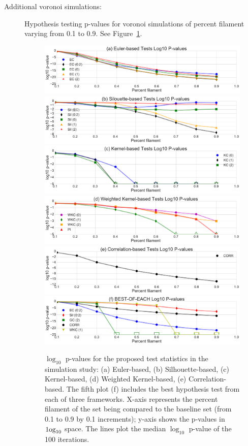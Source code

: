 \documentclass[12pt]{article}
\newcommand{\figref}[1]{Figure~\ref{#1}}
\begin{document}
\begin{description}

\item[Additional voronoi simulations:] Hypothesis testing p-values for voronoi simulations of percent filament varying from 0.1 to 0.9. See \figref{fig:linesUnnorm}.

\begin{figure}[htp!]
  \centering
  \includegraphics[width=0.7\linewidth]{euler_lineplot_log10_norm_False.pdf}
    \includegraphics[width=0.7\linewidth]{silh_lineplot_log10_norm_False.pdf}
    \includegraphics[width=0.7\linewidth]{smooth_lineplot_log10_norm_False.pdf}
    \includegraphics[width=0.7\linewidth]{weight_lineplot_log10_norm_False.pdf}
    \includegraphics[width=0.7\linewidth]{corr_lineplot_log10_norm_False.pdf}
    \includegraphics[width=0.7\linewidth]{cross_lineplot_log10_norm_False.pdf}
    \caption{$\log_{10}$ p-values for the proposed test statistics in the simulation study: (a) Euler-based, (b) Silhouette-based, (c) Kernel-based, (d) Weighted Kernel-based, (e) Correlation-based. The fifth plot (f) includes the best hypothesis test from each of three frameworks. X-axis represents the percent filament of the set being compared to the baseline set (from 0.1 to 0.9 by 0.1 increments); y-axis shows the p-values in $\textup{1og}_{10}$ space. The lines plot the median $\log_{10}$ p-value of the 100 iterations. }
    \label{fig:linesUnnorm}
\end{figure}


\end{description}
\end{document}
